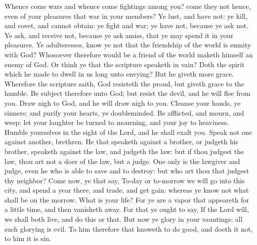 Whence come wars and whence come fightings among you? come they not hence, even of your pleasures that war in your members? Ye lust, and have not: ye kill, and covet, and cannot obtain: ye fight and war; ye have not, because ye ask not. Ye ask, and receive not, because ye ask amiss, that ye may spend it in your pleasures. Ye adulteresses, know ye not that the friendship of the world is enmity with God? Whosoever therefore would be a friend of the world maketh himself an enemy of God. Or think ye that the scripture speaketh in vain? Doth the spirit which he made to dwell in us long unto envying? But he giveth more grace. Wherefore the scripture saith, God resisteth the proud, but giveth grace to the humble. Be subject therefore unto God; but resist the devil, and he will flee from you. Draw nigh to God, and he will draw nigh to you. Cleanse your hands, ye sinners; and purify your hearts, ye doubleminded. Be afflicted, and mourn, and weep: let your laughter be turned to mourning, and your joy to heaviness. Humble yourselves in the sight of the Lord, and he shall exalt you.  Speak not one against another, brethren. He that speaketh against a brother, or judgeth his brother, speaketh against the law, and judgeth the law: but if thou judgest the law, thou art not a doer of the law, but a judge. One only is the lawgiver and judge, even he who is able to save and to destroy: but who art thou that judgest thy neighbor?  Come now, ye that say, To-day or to-morrow we will go into this city, and spend a year there, and trade, and get gain: whereas ye know not what shall be on the morrow. What is your life? For ye are a vapor that appeareth for a little time, and then vanisheth away. For that ye ought to say, If the Lord will, we shall both live, and do this or that. But now ye glory in your vauntings: all such glorying is evil. To him therefore that knoweth to do good, and doeth it not, to him it is sin. 

